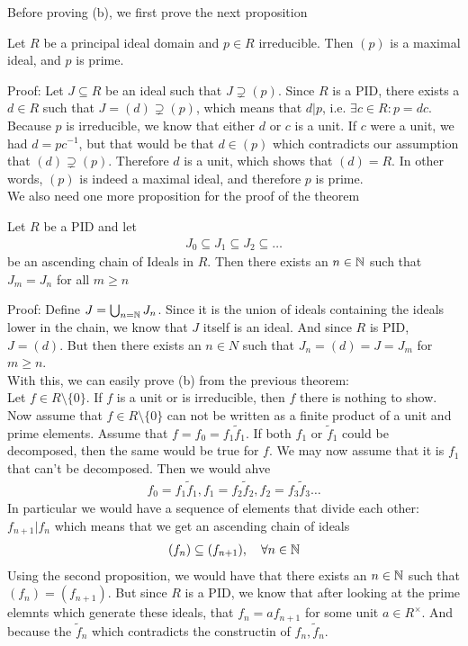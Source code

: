Before proving (b), we first prove the next proposition
\begin{proposition}[]
	Let $R$ be a principal ideal domain and $p \in R$ irreducible. Then $(p)$ is a maximal ideal, and $p$ is prime.
\end{proposition}
Proof:	Let $J \subseteq R$ be an ideal such that $J \supsetneq (p)$. Since $R$ is a PID, there exists a $d \in R$ such that $J = (d) \supsetneq (p)$, which means that $d|p$, i.e. $\exists c \in R: p = dc$. Because $p$ is irreducible, we know that either $d$ or $c$ is a unit. If $c$ were a unit, we had $d = pc^{-1}$, but that would be that $d \in (p)$ which contradicts our assumption that $(d) \supsetneq (p)$. Therefore $d$ is a unit, which shows that $(d) = R$. In other words, $(p)$ is indeed a maximal ideal, and therefore $p$ is prime.\\

We also need one more proposition for the proof of the theorem
\begin{proposition}[]
	Let $R$ be a PID and let
	\begin{align*}
		J_0 \subseteq J_1 \subseteq J_2 \subseteq \ldots
	\end{align*}
	be an ascending chain of Ideals in $R$. Then there exists an $n \in \mathbb{N}$ such that $J_m = J_n$ for all $m \geq n$
\end{proposition}
Proof: Define $J = \bigcup_{n = \mathbb{N}} J_n$. Since it is the union of ideals containing the ideals lower in the chain, we know that $J$ itself is an ideal. And since $R$ is PID, $J = (d)$. But then there exists an $n \in N$ such that $J_n = (d) = J = J_m$ for $m \geq n$.\\


With this, we can easily prove (b) from the previous theorem:\\
Let $f \in R \setminus \{0\}$. If $f$ is a unit or is irreducible, then $f$ there is nothing to show.\\
Now assume that $f \in R \setminus \{0\}$ can not be written as a finite product of a unit and prime elements.
Assume that $f = f_0 = f_1 \tilde{f}_1$. If both $f_1$ or $\tilde{f}_1$ could be decomposed, then the same would be true for $f$. We may now assume that it is $f_1$ that can't be decomposed. Then we would ahve
\begin{align*}
	f_0 = f_1 \tilde{f}_1, f_1 = f_2 \tilde{f}_2, f_2 = f_3 \tilde{f}_3 \ldots
\end{align*}
In particular we would have a sequence of elements that divide each other: $f_{n+1} | f_n$ which means that we get an ascending chain of ideals
\begin{align*}
	(f_n) \subseteq (f_{n+1}), \quad \forall n \in \mathbb{N}
\end{align*}
Using the second proposition, we would have that there exists an $n \in \mathbb{N}$ such that $(f_{n}) = (f_{n+1})$. But since $R$ is a PID, we know that after looking at the prime elemnts which generate these ideals, that $f_{n} = a f_{n+1}$ for some unit $a \in R^{\times}$. And because the $\tilde{f}_n$ which contradicts the constructin of $f_n, \tilde{f}_n$.\\


